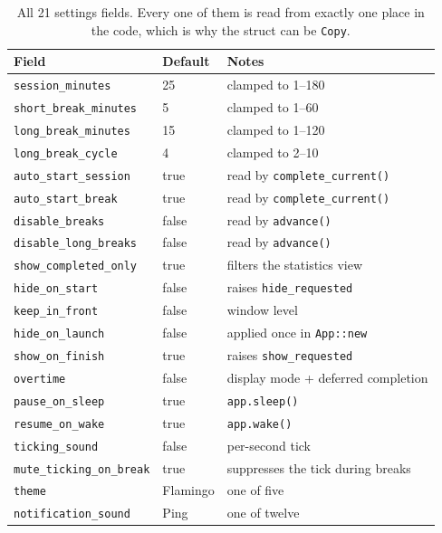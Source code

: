 \begin{table}[H]
\centering\small
\begin{tabular}{@{}p{40mm} p{30mm} p{70mm}@{}}
\toprule
\textbf{Field} & \textbf{Default} & \textbf{Notes} \\
\midrule
\texttt{session\_minutes} & 25 & clamped to 1--180 \\
\texttt{short\_break\_minutes} & 5 & clamped to 1--60 \\
\texttt{long\_break\_minutes} & 15 & clamped to 1--120 \\
\texttt{long\_break\_cycle} & 4 & clamped to 2--10 \\
\texttt{auto\_start\_session} & true & read by \texttt{complete\_current()} \\
\texttt{auto\_start\_break} & true & read by \texttt{complete\_current()} \\
\texttt{disable\_breaks} & false & read by \texttt{advance()} \\
\texttt{disable\_long\_breaks} & false & read by \texttt{advance()} \\
\texttt{show\_completed\_only} & true & filters the statistics view \\
\texttt{hide\_on\_start} & false & raises \texttt{hide\_requested} \\
\texttt{keep\_in\_front} & false & window level \\
\texttt{hide\_on\_launch} & false & applied once in \texttt{App::new} \\
\texttt{show\_on\_finish} & true & raises \texttt{show\_requested} \\
\texttt{overtime} & false & display mode + deferred completion \\
\texttt{pause\_on\_sleep} & true & \texttt{app.sleep()} \\
\texttt{resume\_on\_wake} & true & \texttt{app.wake()} \\
\texttt{ticking\_sound} & false & per-second tick \\
\texttt{mute\_ticking\_on\_break} & true & suppresses the tick during breaks \\
\texttt{theme} & Flamingo & one of five \\
\texttt{notification\_sound} & Ping & one of twelve \\
\bottomrule
\end{tabular}
\caption{All 21 settings fields. Every one of them is read from exactly one place in the
code, which is why the struct can be \texttt{Copy}.}
\end{table}

